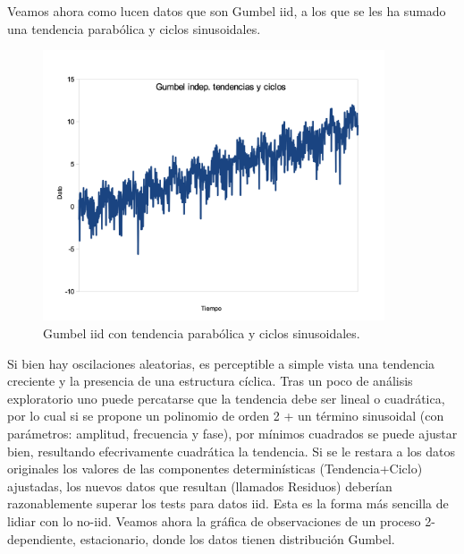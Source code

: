 \documentclass[
  oneside]{book}
\begin{document}
Veamos ahora como lucen datos que son Gumbel iid, a los que se les ha
sumado una tendencia parabólica y ciclos sinusoidales.

\begin{figure}
\centering
\includegraphics[width=0.9\textwidth,height=\textheight]{images/p2.png}
\caption{Gumbel iid con tendencia parabólica y ciclos sinusoidales.}
\end{figure}

Si bien hay oscilaciones aleatorias, es perceptible a simple vista una
tendencia creciente y la presencia de una estructura cíclica. Tras un
poco de análisis exploratorio uno puede percatarse que la tendencia debe
ser lineal o cuadrática, por lo cual si se propone un polinomio de orden
2 + un término sinusoidal (con parámetros: amplitud, frecuencia y fase),
por mínimos cuadrados se puede ajustar bien, resultando efecrivamente
cuadrática la tendencia. Si se le restara a los datos originales los
valores de las componentes determinísticas (Tendencia+Ciclo) ajustadas,
los nuevos datos que resultan (llamados Residuos) deberían
razonablemente superar los tests para datos iid. Esta es la forma más
sencilla de lidiar con lo no-iid. Veamos ahora la gráfica de
observaciones de un proceso 2-dependiente, estacionario, donde los datos
tienen distribución Gumbel.
\end{document}
